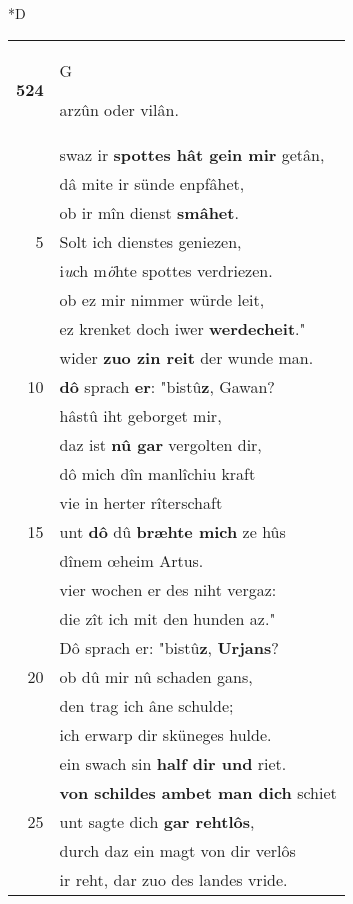 \documentclass[8pt,a4paper,notitlepage]{article}
\begin{document}
\begin{table}[ht]
\begin{minipage}[t]{0.5\linewidth}
\small
\begin{center}*D
\end{center}
\begin{tabular}{rl}
\textbf{524} & \begin{large}G\end{large}arzûn oder vilân.\\ 
 & swaz ir \textbf{spottes hât gein mir} getân,\\ 
 & dâ mite ir sünde enpfâhet,\\ 
 & ob ir mîn dienst \textbf{smâhet}.\\ 
5 & Solt ich dienstes geniezen,\\ 
 & i\textit{u}ch m\textit{ö}hte spottes verdriezen.\\ 
 & ob ez mir nimmer würde leit,\\ 
 & ez krenket doch iwer \textbf{werdecheit}."\\ 
 & wider \textbf{zuo zin reit} der wunde man.\\ 
10 & \textbf{dô} sprach \textbf{er}: "bistû\textbf{z}, Gawan?\\ 
 & hâstû iht geborget mir,\\ 
 & daz ist \textbf{nû gar} vergolten dir,\\ 
 & dô mich dîn manlîchiu kraft\\ 
 & vie in herter rîterschaft\\ 
15 & unt \textbf{dô} dû \textbf{bræhte mich} ze hûs\\ 
 & dînem œheim Artus.\\ 
 & vier wochen er des niht vergaz:\\ 
 & die zît ich mit den hunden az."\\ 
 & Dô sprach er: "bistû\textbf{z}, \textbf{Urjans}?\\ 
20 & ob dû mir nû schaden gans,\\ 
 & den trag ich âne schulde;\\ 
 & ich erwarp dir sküneges hulde.\\ 
 & ein swach sin \textbf{half dir und} riet.\\ 
 & \textbf{von schildes ambet man dich} schiet\\ 
25 & unt sagte dich \textbf{gar rehtlôs},\\ 
 & durch daz ein magt von dir verlôs\\ 
 & ir reht, dar zuo des landes vride.\\ 

\end{tabular}
\end{minipage}
\end{table}
\end{document}
